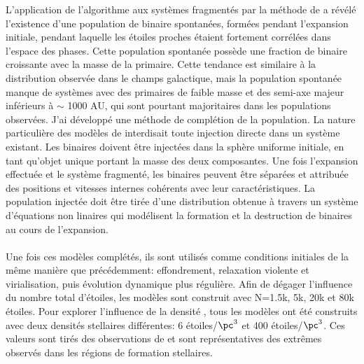 L'application de l'algorithme aux syst\`emes fragment\'es par la m\'ethode de \HubLem a r\'ev\'el\'e l'existence d'une population de binaire spontan\'ees, form\'ees pendant l'expansion initiale, pendant laquelle les \'etoiles proches \'etaient fortement corr\'el\'ees dans l'espace des phases. Cette population spontan\'ee poss\`ede une fraction de binaire croissante avec la masse de la primaire. Cette tendance est similaire \`a la distribution observ\'ee dans le champs galactique, mais la population spontan\'ee manque de syst\`emes avec des primaires de faible masse et des semi-axe majeur inf\'erieurs \`a $\sim$ 1000 AU, qui sont pourtant majoritaires dans les populations observ\'ees. J'ai d\'evelopp\'e une m\'ethode de compl\'etion de la population. La nature particuli\`ere des mod\`eles de \HubLem interdisait toute injection directe dans un syst\`eme existant. Les binaires doivent \^etre inject\'ees dans la sph\`ere uniforme initiale, en tant qu'objet unique portant la masse des deux composantes. Une fois l'expansion effectu\'ee et le syst\`eme fragment\'e, les binaires peuvent \^etre s\'epar\'ees et attribu\'ee des positions et vitesses internes coh\'erents avec leur caract\'eristiques. La population inject\'ee doit \^etre tir\'ee d'une distribution obtenue \`a travers un syst\`eme d'\'equations non linaires qui mod\'elisent la formation et la destruction de binaires au cours de l'expansion.

\paragraph*{}
Une fois ces mod\`eles compl\'et\'es, ils sont utilis\'es comme conditions initiales de la m\^eme mani\`ere que pr\'ec\'edemment: effondrement, relaxation violente et virialisation, puis \'evolution dynamique plus r\'eguli\`ere. Afin de d\'egager l'influence du nombre total d'\'etoiles, les mod\`eles sont construit avec N=1.5k, 5k, 20k et 80k \'etoiles. Pour explorer l'influence de la densit\'e , tous les mod\`eles ont \'et\'e construits avec deux densit\'es stellaires diff\'erentes: 6 \'etoiles/$\pc^3$ et 400 \'etoiles/$\pc^3$. Ces valeurs sont tir\'es des observations de \cite{King2012a} et sont repr\'esentatives des extr\^emes observ\'es dans les r\'egions de formation stellaires.

